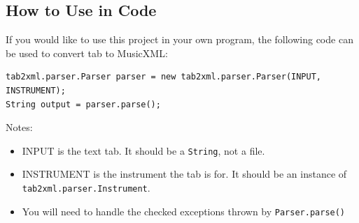 \documentclass[11pt]{article}
\begin{document}
\subsection{How to Use in Code}
\label{sec:org5d586b9}
If you would like to use this project in your own program, the following code can be used to convert tab to MusicXML:

\begin{verbatim}
tab2xml.parser.Parser parser = new tab2xml.parser.Parser(INPUT, INSTRUMENT);  
String output = parser.parse();  
\end{verbatim}

Notes:
\begin{itemize}
\item INPUT is the text tab.  It should be a \texttt{String}, not a file.
\item INSTRUMENT is the instrument the tab is for.  It should be an instance of \texttt{tab2xml.parser.Instrument}.
\item You will need to handle the checked exceptions thrown by \texttt{Parser.parse()}
\end{itemize}
\end{document}
